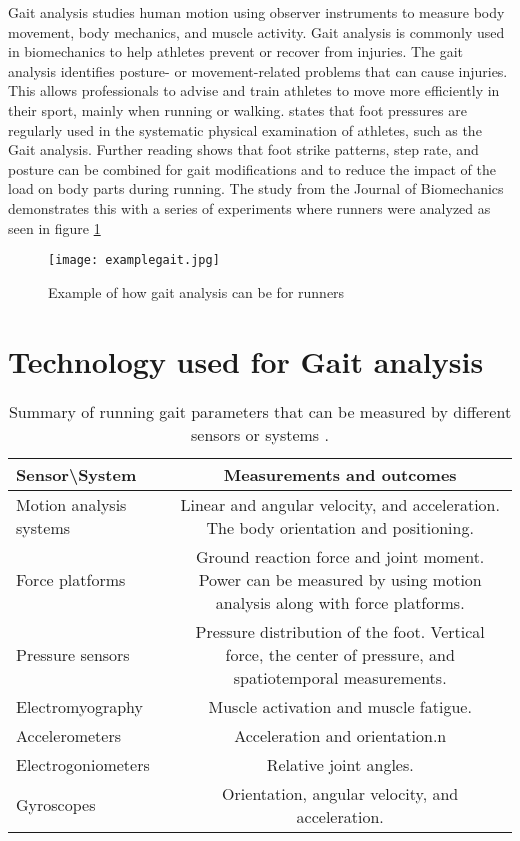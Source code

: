 Gait analysis studies human motion using observer instruments to measure body movement, body mechanics, and muscle activity. Gait analysis is commonly used in biomechanics to help athletes prevent or recover from injuries. The gait analysis identifies posture- or movement-related problems that can cause injuries. This allows professionals to advise and train athletes to move more efficiently in their sport, mainly when running or walking. \cite{Baker2006} states that foot pressures are regularly used in the systematic physical examination of athletes, such as the Gait analysis. Further reading shows that foot strike patterns, step rate, and posture can be combined for gait modifications and to reduce the impact of the load on body parts during running. The study \cite{HUANG2019102} from the Journal of Biomechanics demonstrates this with a series of experiments where runners were analyzed as seen in figure \ref{fig:examplegait}  

\begin{figure}[!htb]
    \centering
    \texttt{[image: examplegait.jpg]}
    \caption{Example of how gait analysis can be for runners}
    \label{fig:examplegait}
\end{figure}


\newpage
\section{Technology used for Gait analysis}
\label{technologygair}

\begin{table}[!h]
    \mytable
    \caption{Summary of running gait parameters that can be measured by different sensors or systems \cite{higginsonbrian2009}.}
    \begin{tabularx}{\linewidth}{@{}lC@{}}
        \toprule
        Sensor\textbackslash System     & Measurements and outcomes \\
        \midrule
        Motion analysis systems                       & Linear and angular velocity, and acceleration. The body orientation and positioning.\\
        Force platforms    & Ground reaction force and joint moment. Power can be measured by using motion analysis along with force platforms. \\
        Pressure sensors        & Pressure distribution of the foot. Vertical force, the center of pressure, and spatiotemporal measurements. \\
        Electromyography  & Muscle activation and muscle fatigue.\\
        Accelerometers  & Acceleration and orientation.n\\
        Electrogoniometers  & Relative joint angles.\\
        Gyroscopes  & Orientation, angular velocity, and acceleration.\\
        \bottomrule
    \end{tabularx}
    \label{tbl:exemplars}
\end{table}
\clearpage
